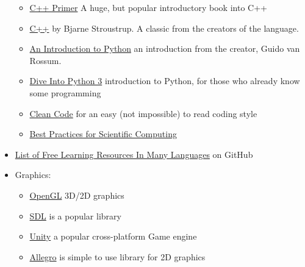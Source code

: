 \documentclass{article}
\begin{document}
\begin{itemize}
\begin{itemize}
        \item \href{https://www.goodreads.com/book/show/768080.C_Primer}{C++ Primer} A huge, but popular introductory book into C++
        \item \href{https://www.goodreads.com/book/show/112251.The_C_Programming_Language}{C++} by Bjarne Stroustrup. A classic from the creators of the language.
        \item \href{https://www.goodreads.com/book/show/475667.An_Introduction_to_Python}{An Introduction to Python} an introduction from the creator, Guido van Rossum.
        \item \href{https://diveintopython3.problemsolving.io/}{Dive Into Python 3} introduction to Python, for those who already know some programming
        

        \item \href{https://www.goodreads.com/book/show/3735293-clean-code}{Clean Code} for an easy (not impossible) to read coding style
        
        \item \href{https://arxiv.org/pdf/1210.0530.pdf}{Best Practices for Scientific Computing}
    \end{itemize}

    \item \href{https://github.com/EbookFoundation/free-programming-books}{List of Free Learning Resources In Many Languages} on GitHub
    
    \item Graphics:
    \begin{itemize}
        \item \href{https://www.opengl.org/}{OpenGL} 3D/2D graphics
        \item \href{https://www.libsdl.org/}{SDL} is a popular library
        \item \href{https://unity.com/}{Unity} a popular cross-platform Game engine
        \item \href{https://liballeg.org/}{Allegro} is simple to use library for 2D graphics
    \end{itemize}
    

\end{itemize}
\end{document}
